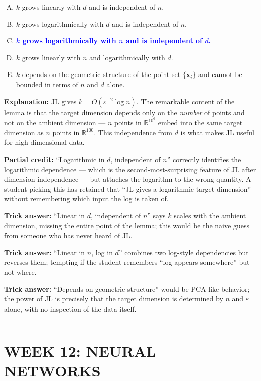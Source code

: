 \documentclass[12pt]{amsart}
\newcommand{\divider}{
  \vspace{-1em}
  \noindent
  \raisebox{-0.15ex}{\textbullet}%
  \hspace{0.5em}%
  \rule[0.5ex]{0.95\textwidth}{1.0pt}%
  \hspace{0.5em}%
  \raisebox{-0.15ex}{\textbullet}%
  \vspace{0em}
}
\begin{document}
\begin{enumerate}[(A)]
\item $k$ grows linearly with $d$ and is independent of $n$.
\item $k$ grows logarithmically with $d$ and is independent of $n$.
\item \textcolor{blue}{\textbf{$k$ grows logarithmically with $n$ and is independent of $d$.}}
\item $k$ grows linearly with $n$ and logarithmically with $d$.
\item $k$ depends on the geometric structure of the point set $\{\mathbf{x}_i\}$
and cannot be bounded in terms of $n$ and $d$ alone.
\end{enumerate}

\textbf{Explanation:}
JL gives $k = O(\varepsilon^{-2} \log n)$. The remarkable content of the
lemma is that the target dimension depends only on the \emph{number} of
points and not on the ambient dimension --- $n$ points in $\mathbb{R}^{10^6}$
embed into the same target dimension as $n$ points in $\mathbb{R}^{100}$.
This independence from $d$ is what makes JL useful for high-dimensional data.

\textbf{Partial credit:}
``Logarithmic in $d$, independent of $n$'' correctly identifies the logarithmic
dependence --- which is the second-most-surprising feature of JL after dimension
independence --- but attaches the logarithm to the wrong quantity. A student
picking this has retained that ``JL gives a logarithmic target dimension''
without remembering which input the log is taken of.

\textbf{Trick answer:}
``Linear in $d$, independent of $n$'' says $k$ scales with the ambient
dimension, missing the entire point of the lemma; this would be the naive
guess from someone who has never heard of JL.

\textbf{Trick answer:}
``Linear in $n$, log in $d$'' combines two log-style dependencies but reverses
them; tempting if the student remembers ``log appears somewhere'' but not where.

\textbf{Trick answer:}
``Depends on geometric structure'' would be PCA-like behavior; the power of
JL is precisely that the target dimension is determined by $n$ and
$\varepsilon$ alone, with no inspection of the data itself.

\divider

\newpage

\section*{WEEK 12: NEURAL NETWORKS}
\end{document}
